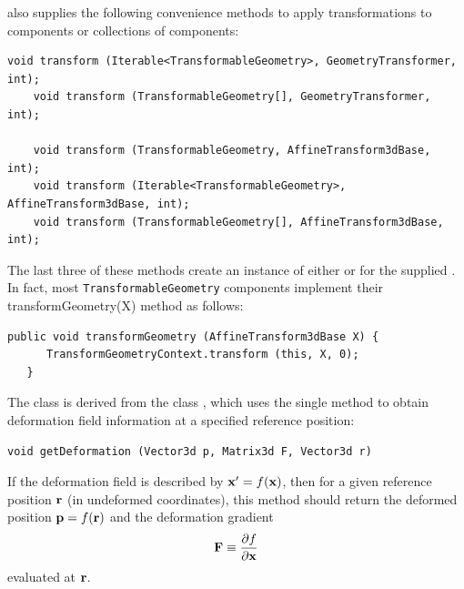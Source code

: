  also
supplies the following convenience methods to apply transformations to
components or collections of components:
%
\begin{lstlisting}[]
    void transform (Iterable<TransformableGeometry>, GeometryTransformer, int);
    void transform (TransformableGeometry[], GeometryTransformer, int);

    void transform (TransformableGeometry, AffineTransform3dBase, int);
    void transform (Iterable<TransformableGeometry>, AffineTransform3dBase, int);
    void transform (TransformableGeometry[], AffineTransform3dBase, int);
\end{lstlisting}
%
The last three of these methods create an instance of either
 or
 for the supplied
. In fact, most
{\tt TransformableGeometry} components implement their
%
{transformGeometry(X)} method as follows:
%
\begin{lstlisting}[]
   public void transformGeometry (AffineTransform3dBase X) {
      TransformGeometryContext.transform (this, X, 0);
   }
\end{lstlisting}
%

The 
class is derived from the
class , which uses
the single method
 to
obtain deformation field information at a specified reference position:
%
\begin{lstlisting}[]
    void getDeformation (Vector3d p, Matrix3d F, Vector3d r)
\end{lstlisting}
%
If the deformation field is described by ${\bf x}' = f({\bf x})$, then
for a given reference position ${\bf r}$ (in undeformed coordinates),
this method should return the deformed position ${\bf p} = f({\bf r})$
and the deformation gradient
%
\begin{equation}
{\bf F} \equiv \frac{\partial f}{\partial {\bf x}}
\end{equation}
%
evaluated at ${\bf r}$. 

